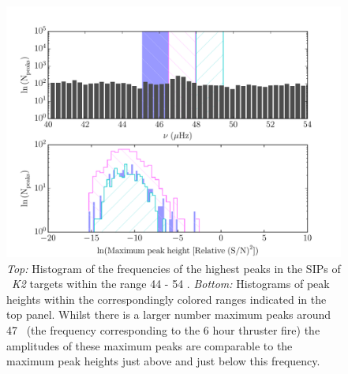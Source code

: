 \documentclass[useAMS, usenatbib, preprint, 12pt]{aastex}
\begin{document}
\begin{figure}
\begin{center}
\includegraphics[width=6in, clip=true]{sip_hist.pdf}
\caption{{\it Top:} Histogram of the frequencies of the highest peaks in the
	SIPs of \nGO\ {\it K2} targets within the range 44 - 54 \uHz.
	{\it Bottom:} Histograms of peak heights within the correspondingly
	colored ranges indicated in the top panel.
	Whilst there is a larger number maximum peaks around 47 \uHz\ (the
	frequency corresponding to the 6 hour thruster fire) the amplitudes of
	these maximum peaks are comparable to the maximum peak heights just
	above and just below this frequency.}
\label{fig:sip_hist}
\end{center}
\end{figure}
\end{document}
